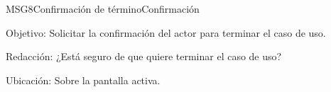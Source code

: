 \begin{mensaje}{MSG8}{Confirmación  de término}{Confirmación}
	\item [Objetivo:] Solicitar la confirmación del actor para terminar el caso de uso.
	\item[Redacción:] ¿Está seguro de que quiere terminar el caso de uso?
	\item [Ubicación:] Sobre la pantalla activa.
\end{mensaje}